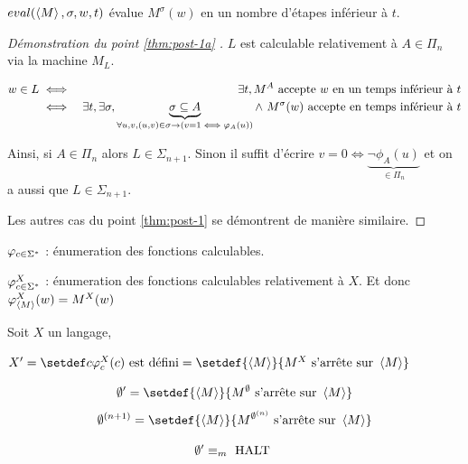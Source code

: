 \begin{definition}
	$eval(\left\langle M\right\rangle, \sigma,w,t)$ évalue $M^{\sigma}(w)$ en un nombre d'étapes inférieur à $t$.
\end{definition}

\begin{proof}[Démonstration du point \ref{thm:post-1a} \bimpRL]

	$L$ est calculable relativement à $A \in \Pi_n$ via la machine $M_L$.

	\begin{eqnarray*}
		w \in L &\iff& \exists t, M^A \text{ accepte } w \text{ en un temps inférieur à } t\\
		&\iff& \exists t, \exists \sigma,
		\underbrace{\sigma \subseteq A}_{\forall u,v, (u,v) \in \sigma \rightarrow (v=1 \iff \varphi_A(u))}
		\land\  M^{\sigma} (w) \text{ accepte en temps inférieur à }t
	\end{eqnarray*}

	Ainsi, si $A \in \Pi_n$ alors $L \in \Sigma_{n+1}$. Sinon il suffit d'écrire
	$v = 0 \iff \underbrace{\lnot \phi_A(u)}_{\in \Pi_n}$ et on a aussi que $L \in \Sigma_{n+1}$.

	Les autres cas du point \ref{thm:post-1} se démontrent de manière similaire.
\end{proof}

\begin{notation}
	$\varphi_{c \in \Sigma^{*}}$ : énumeration des fonctions calculables.

	$\varphi_{c \in \Sigma^{*}}^X$ : énumeration des fonctions calculables relativement à $X$. Et donc $\varphi_{\left\langle M\right\rangle}^X(w) = M^X(w)$
\end{notation}

\begin{definition}
	Soit $X$ un langage,

	$X' = \setdef c {\phi_c^X(c) \text{ est défini}} = \setdef {\encode M} {M^X \text{ s'arrête sur } \encode M}$

\end{definition}


\begin{definition}
	$$\emptyset' = \setdef {\encode M} {M^{\emptyset} \text{ s'arrête sur } \encode M}$$
	$$\emptyset^{(n+1)} = \setdef {\encode M} {M^{\emptyset^{(n)}} \text{ s'arrête sur } \encode M} $$
\end{definition}


\begin{remarque}
	$$\emptyset' \equiv_m \text{ HALT }$$
\end{remarque}


